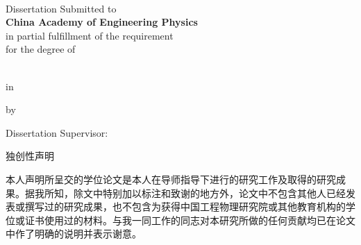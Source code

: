 \clearpage

\begin{center}
  \bfseries
  \fontsize{20pt}{20pt} \selectfont
  \hspace*{\fill}\\
  \theentitle
\end{center}

\vspace{20pt}

\begin{center}
  Dissertation Submitted to\\
  \textbf{China Academy of Engineering Physics}\\
  in partial fulfillment of the requirement\\
  for the degree of\\
  \textbf{\thedgreelevelen}\\
\end{center}

\vspace{20pt}

\begin{center}
  in
  \\
  \textbf{\thefielden}
\end{center}
\vspace{20pt}
\begin{center}
  by\\
  \textbf{\theenauthor}
\end{center}

\vspace{50pt}

\begin{center}
  Dissertation Supervisor: \printsupervisoren \printsecondsupervisoren
\end{center}

\vspace{20pt}

\begin{center}
  \textbf{\thethesismonthen}
\end{center}

\clearpage
\vspace{20pt}
\begin{center}
  独创性声明
\end{center}
\vspace{40pt}
\par 本人声明所呈交的学位论文是本人在导师指导下进行的研究工作及取得的研究成果。据我所知，除文中特别加以标注和致谢的地方外，论文中不包含其他人已经发表或撰写过的研究成果，也不包含为获得中国工程物理研究院或其他教育机构的学位或证书使用过的材料。与我一同工作的同志对本研究所做的任何贡献均已在论文中作了明确的说明并表示谢意。

